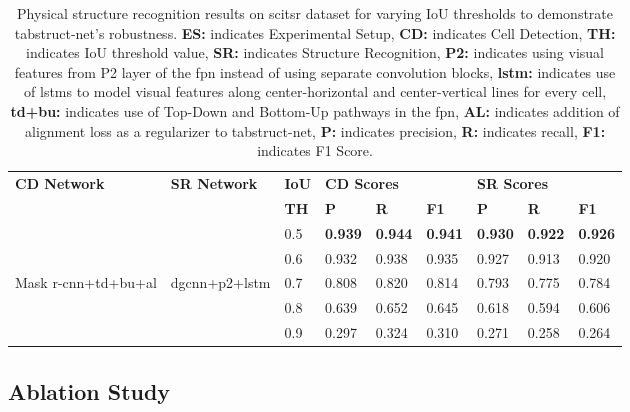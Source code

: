 \documentclass[runningheads]{llncs}
\begin{document}
\begin{table}
\addtolength{\tabcolsep}{-1.0pt}
\begin{center}
\begin{tabular}{|l |l| l| l l l| l l l|} \hline
\textbf{CD Network} & \textbf{SR Network} &\textbf{IoU} &\multicolumn{3}{l|}{\textbf{CD Scores}} &\multicolumn{3}{l|}{\textbf{SR Scores}} \\ \cline{4-9}
 &  &\textbf{TH} &\textbf{P} &\textbf{R} &\textbf{F1} &\textbf{P} &\textbf{R} &\textbf{F1} \\ \hline
 &  &0.5	&\textbf{0.939} &\textbf{0.944} &\textbf{0.941} &\textbf{0.930} &\textbf{0.922} &\textbf{0.926} \\  
 &      &0.6 &0.932	&0.938	&0.935	&0.927	&0.913	&0.920 \\
Mask {\sc r-cnn}+{\sc td}+{\sc bu}+{\sc al} &{\sc dgcnn}+{\sc p}2+{\sc lstm}  &0.7 &0.808 &0.820 &0.814 &0.793 &0.775 &0.784 \\
 &      &0.8 &0.639	&0.652 &0.645 &0.618 &0.594	&0.606 \\
 &      &0.9 &0.297	&0.324 &0.310 &0.271 &0.258	&0.264 \\ \hline
 \end{tabular}
\end{center}
\caption{Physical structure recognition results on {\sc s}ci{\sc tsr} dataset for varying IoU thresholds to demonstrate {\sc t}ab{\sc s}truct-{\sc n}et's robustness. \textbf{ES:} indicates Experimental Setup, \textbf{CD:} indicates Cell Detection, \textbf{TH:} indicates IoU threshold value, \textbf{SR:} indicates Structure Recognition, \textbf{P2:} indicates using visual features from P2 layer of the {\sc fpn} instead of using separate convolution blocks, \textbf{{\sc lstm}:} indicates use of {\sc lstm}s to model visual features along center-horizontal and center-vertical lines for every cell, \textbf{{\sc td}+{\sc bu}:} indicates use of Top-Down and Bottom-Up pathways in the {\sc fpn}, \textbf{AL:} indicates addition of alignment loss as a regularizer to {\sc t}ab{\sc s}truct-{\sc n}et, \textbf{P:} indicates precision, \textbf{R:} indicates recall, \textbf{F1:} indicates F1 Score. \label{table_varying_ious_physical_scitsr}}
\vspace{-1em}
\end{table}

\newpage
\subsection{Ablation Study}
\end{document}
